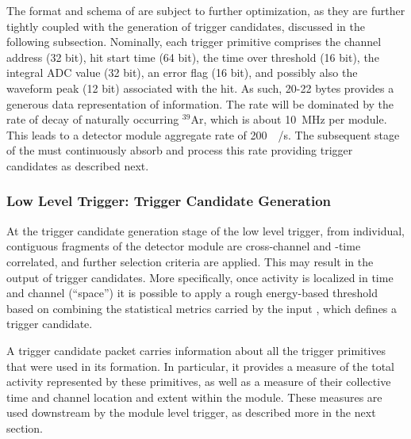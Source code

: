 The format and schema of  are subject to further
optimization, as they are further tightly coupled with the generation of
trigger candidates, discussed in the following subsection. Nominally,
each trigger primitive comprises the channel address (32 bit), hit
start time (64 bit), the time over
threshold (16 bit), the integral ADC value (32 bit), an error flag (16
bit), and possibly also
the waveform peak (12 bit) associated with the hit. 
As such, 20-22 bytes provides a generous data
representation of  information. 
The  rate will be dominated by the rate of decay of naturally occurring
$^{39}$Ar, which is about \SI{10}{\mega\hertz} per module.
This leads to a detector module aggregate rate of
\SI{200}{\mega\byte/\second}.
The subsequent stage of the  must continuously absorb and process this
rate providing trigger candidates as described next.


\subsubsection{Low Level Trigger: Trigger Candidate Generation}

At the trigger candidate generation stage of the low level trigger,
 from individual, contiguous fragments of the
detector 
module are cross-channel and -time correlated, and further selection
criteria are applied. This may result in the
output of trigger candidates. 
More specifically, once activity is localized in time and channel (``space'') it is
possible to apply a rough energy-based threshold based on combining the
statistical metrics carried by the input , which
defines a trigger candidate. 

A trigger candidate packet carries information about all the trigger
primitives that were used in its formation. 
In particular, it provides a measure of the total activity represented
by these primitives, as well as a measure of their collective time and channel
location and extent within the module.
These measures are used downstream by the module level trigger, 
as described more in the next section.

